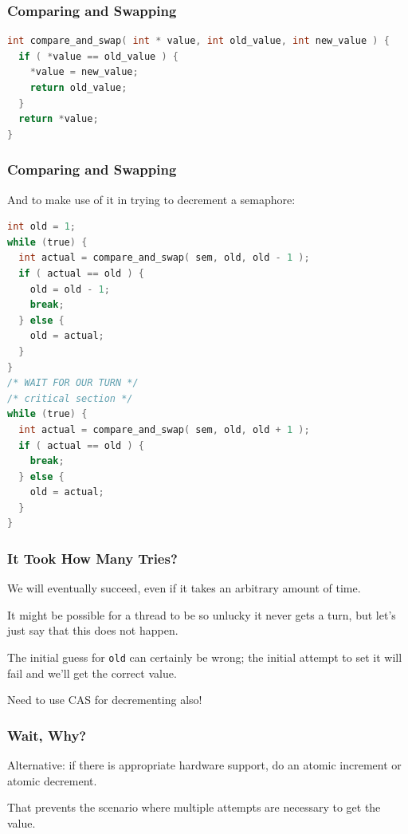 \begin{frame}[fragile]
\frametitle{Comparing and Swapping}

\begin{lstlisting}[language=C]
int compare_and_swap( int * value, int old_value, int new_value ) {
  if ( *value == old_value ) {
    *value = new_value;
    return old_value;
  }
  return *value;
}
\end{lstlisting}

\end{frame}

\begin{frame}[fragile]
\frametitle{Comparing and Swapping}

And to make use of it in trying to decrement a semaphore:

\begin{lstlisting}[language=C]
int old = 1;
while (true) {
  int actual = compare_and_swap( sem, old, old - 1 );
  if ( actual == old ) {
    old = old - 1;
    break;
  } else {
    old = actual;
  }
}
/* WAIT FOR OUR TURN */
/* critical section */
while (true) {
  int actual = compare_and_swap( sem, old, old + 1 );
  if ( actual == old ) {
    break;
  } else {
    old = actual;
  }
}
\end{lstlisting}

\end{frame}

\begin{frame}
\frametitle{It Took How Many Tries?}

We will eventually succeed, even if it takes an arbitrary amount of time.

 It might be possible for a thread to be so unlucky it never gets a turn, but let's just say that this does not happen.

The initial guess for \texttt{old} can certainly be wrong; the initial attempt to set it will fail and we'll get the correct value.

Need to use CAS for decrementing also!

\end{frame}

\begin{frame}
\frametitle{Wait, Why?}

Alternative: if there is appropriate hardware support, do an atomic increment or atomic decrement.

That prevents the scenario where multiple attempts are necessary to get the value. 

\end{frame}

